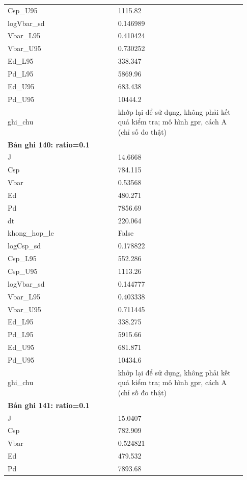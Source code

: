 \begin{longtable}{p{0.43\linewidth}p{0.50\linewidth}}
Csp\_\allowbreak U95 & 1115.82 \\
logVbar\_\allowbreak sd & 0.146989 \\
Vbar\_\allowbreak L95 & 0.410424 \\
Vbar\_\allowbreak U95 & 0.730252 \\
Ed\_\allowbreak L95 & 338.347 \\
Pd\_\allowbreak L95 & 5869.96 \\
Ed\_\allowbreak U95 & 683.438 \\
Pd\_\allowbreak U95 & 10444.2 \\
ghi\_\allowbreak chu & khớp lại để sử dụng, không phải kết quả kiểm tra; mô hình gpr, cách A (chỉ số đo thật) \\
\midrule
\multicolumn{2}{p{0.95\linewidth}}{\textbf{Bản ghi 140: ratio=0.1}} \\
J & 14.6668 \\
Csp & 784.115 \\
Vbar & 0.53568 \\
Ed & 480.271 \\
Pd & 7856.69 \\
dt & 220.064 \\
khong\_\allowbreak hop\_\allowbreak le & False \\
logCsp\_\allowbreak sd & 0.178822 \\
Csp\_\allowbreak L95 & 552.286 \\
Csp\_\allowbreak U95 & 1113.26 \\
logVbar\_\allowbreak sd & 0.144777 \\
Vbar\_\allowbreak L95 & 0.403338 \\
Vbar\_\allowbreak U95 & 0.711445 \\
Ed\_\allowbreak L95 & 338.275 \\
Pd\_\allowbreak L95 & 5915.66 \\
Ed\_\allowbreak U95 & 681.871 \\
Pd\_\allowbreak U95 & 10434.6 \\
ghi\_\allowbreak chu & khớp lại để sử dụng, không phải kết quả kiểm tra; mô hình gpr, cách A (chỉ số đo thật) \\
\midrule
\multicolumn{2}{p{0.95\linewidth}}{\textbf{Bản ghi 141: ratio=0.1}} \\
J & 15.0407 \\
Csp & 782.909 \\
Vbar & 0.524821 \\
Ed & 479.532 \\
Pd & 7893.68 \\

\end{longtable}
